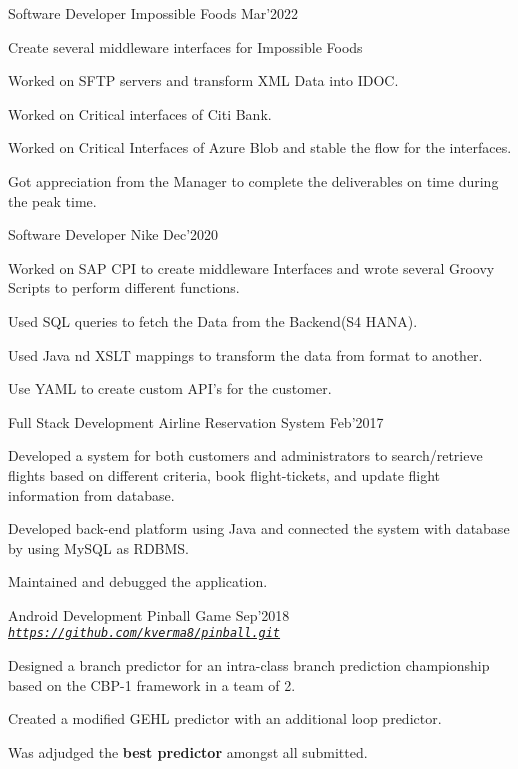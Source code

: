 
\begin{cventries}

  \cventry
  {Software Developer}
  {Impossible Foods}
  {}
  {Mar'2022}
  {
    \begin{cvitems}
    \item Create several middleware interfaces for Impossible Foods
    \item Worked on SFTP servers and transform XML Data into IDOC.
    \item Worked on Critical interfaces of Citi Bank.
    \item Worked on Critical Interfaces of Azure Blob and stable the flow for the interfaces.
    \item Got appreciation from the Manager to complete the deliverables on time during the peak time.
    \end{cvitems}
  }

  \cventry
  {Software Developer}
  {{Nike}}
  {Dec'2020}
  {
    \begin{cvitems}
    \item Worked on SAP CPI to create middleware Interfaces and wrote several Groovy Scripts to perform different functions. 
    \item Used SQL queries to fetch the Data from the Backend(S4 HANA).
    \item Used Java nd XSLT mappings to transform the data from format to another.
    \item Use YAML to create custom API's for the customer.
    \end{cvitems}
  }

  \cventry
  {Full Stack Development}
  {{Airline Reservation System}}
  {Feb'2017}
  {}
  {
    \begin{cvitems}
    \item Developed a system for both customers and administrators to search/retrieve flights based on different criteria, book flight-tickets, and update flight information from database.
    \item Developed back-end platform using Java and connected the system with database by using MySQL as RDBMS.
    \item Maintained and debugged the application.
    \end{cvitems}
  }
  
  \cventry
  {Android Development}
  {{Pinball Game}}
  {}
  {Sep'2018}
  {\emph{\texttt{\href{https://github.com/kverma8/pinball.git}{https://github.com/kverma8/pinball.git}}}}
  {
    \begin{cvitems}
    \item Designed a branch predictor for an intra-class branch prediction
      championship based on the CBP-1 framework in a team of 2.
    \item Created a modified GEHL predictor with an additional loop predictor.
    \item Was adjudged the \textbf{best predictor} amongst all submitted.
    \end{cvitems}
  }




  
\end{cventries}
\vspace{-2mm}


